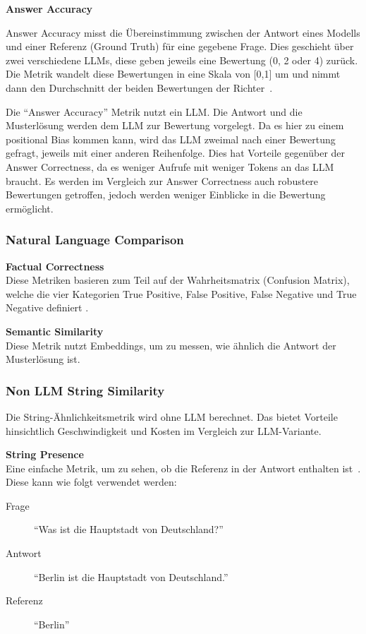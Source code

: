 \textbf{Answer Accuracy}
\begin{plainquote}
Answer Accuracy misst die Übereinstimmung zwischen der Antwort eines Modells und einer Referenz (Ground Truth) für eine gegebene Frage. Dies geschieht über zwei verschiedene LLMs, diese geben jeweils eine Bewertung (0, 2 oder 4) zurück. Die Metrik wandelt diese Bewertungen in eine Skala von [0,1] um und nimmt dann den Durchschnitt der beiden Bewertungen der Richter~\cite{ragas_nvidia_metrics}.
\end{plainquote}

Die \enquote{Answer Accuracy} Metrik nutzt ein LLM. Die Antwort und die Musterlösung werden dem LLM zur Bewertung vorgelegt. Da es hier zu einem positional Bias kommen kann, wird das LLM zweimal nach einer Bewertung gefragt, jeweils mit einer anderen Reihenfolge.
Dies hat Vorteile gegenüber der Answer Correctness, da es weniger Aufrufe mit weniger Tokens an das LLM braucht.
Es werden im Vergleich zur Answer Correctness auch robustere Bewertungen getroffen, jedoch werden weniger Einblicke in die Bewertung ermöglicht.

\subsubsection{Natural Language Comparison}

\textbf{Factual Correctness}\\
Diese Metriken basieren zum Teil auf der Wahrheitsmatrix (Confusion Matrix), welche die vier Kategorien True Positive, False Positive, False Negative und True Negative definiert \cite{wikipedia_confusion_matrix}.

\textbf{Semantic Similarity}\\
Diese Metrik nutzt Embeddings, um zu messen, wie ähnlich die Antwort der Musterlösung ist.

\subsubsection{Non LLM String Similarity}
Die String-Ähnlichkeitsmetrik wird ohne LLM berechnet.
Das bietet Vorteile hinsichtlich Geschwindigkeit und Kosten im Vergleich zur LLM-Variante.

\textbf{String Presence}\\
Eine einfache Metrik, um zu sehen, ob die Referenz in der Antwort enthalten ist~\cite{ragas_traditional_metrics}.
Diese kann wie folgt verwendet werden:
\begin{description}
    \item[Frage] \enquote{Was ist die Hauptstadt von Deutschland?}
    \item [Antwort] \enquote{Berlin ist die Hauptstadt von Deutschland.}
    \item [Referenz] \enquote{Berlin}
\end{description}

